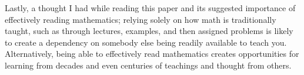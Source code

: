 \documentclass[12pt]{article}
\begin{document}
\begin{flushleft}
Lastly, a thought I had while reading this paper and its suggested importance of effectively reading mathematics; relying solely on how math is traditionally taught, such as through lectures, examples, and then assigned problems is likely to create a dependency on somebody else being readily available to teach you. Alternatively, being able to effectively read mathematics creates opportunities for learning from decades and even centuries of teachings and thought from others.
\end{flushleft}
\end{document}
